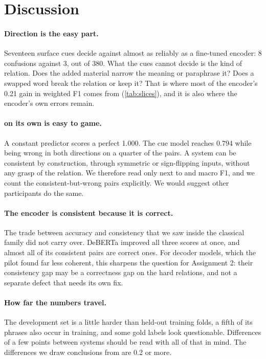 \section{Discussion}
\label{sec:discussion}

\paragraph{Direction is the easy part.}
Seventeen surface cues decide \FW{} against \BW{} almost as reliably as a fine-tuned encoder: 8 confusions against 3, out of 380. What the cues cannot decide is the kind of relation. Does the added material narrow the meaning or paraphrase it? Does a swapped word break the relation or keep it? That is where most of the encoder's 0.21 gain in weighted F1 comes from (\cref{tab:slices}), and it is also where the encoder's own errors remain.

\paragraph{\SoftCons{} on its own is easy to game.}
A constant \EQ{} predictor scores a perfect 1.000. The cue model reaches 0.794 while being wrong in both directions on a quarter of the pairs. A system can be consistent by construction, through symmetric or sign-flipping inputs, without any grasp of the relation. We therefore read \SoftCons{} only next to \HardCons{} and macro F1, and we count the consistent-but-wrong pairs explicitly. We would suggest other participants do the same.

\paragraph{The encoder is consistent because it is correct.}
The trade between accuracy and consistency that we saw inside the classical family did not carry over. DeBERTa improved all three scores at once, and almost all of its consistent pairs are correct ones. For decoder models, which the pilot found far less coherent, this sharpens the question for Assignment 2: their consistency gap may be a correctness gap on the hard relations, and not a separate defect that needs its own fix.

\paragraph{How far the numbers travel.}
The development set is a little harder than held-out training folds, a fifth of its phrases also occur in training, and some gold labels look questionable. Differences of a few points between systems should be read with all of that in mind. The differences we draw conclusions from are 0.2 or more.
